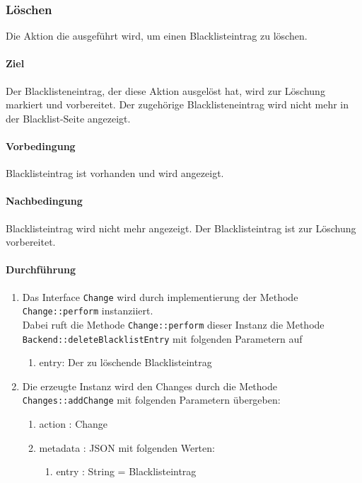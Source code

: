 \subsubsection{Löschen}

Die Aktion die ausgeführt wird, um einen Blacklisteintrag zu löschen.

\paragraph*{Ziel}
Der Blacklisteneintrag, der diese Aktion ausgelöst hat, wird zur Löschung markiert und vorbereitet.
Der zugehörige Blacklisteneintrag wird nicht mehr in der Blacklist-Seite angezeigt.

\paragraph*{Vorbedingung}
Blacklisteintrag ist vorhanden und wird angezeigt.

\paragraph*{Nachbedingung}
Blacklisteintrag wird nicht mehr angezeigt. Der Blacklisteintrag ist zur Löschung vorbereitet.

\paragraph*{Durchführung}
\begin{enumerate}
    \item Das Interface \verb#Change# wird durch implementierung der Methode \verb#Change::perform# instanziiert. \\
          Dabei ruft die Methode \verb#Change::perform# dieser Instanz die Methode \verb#Backend::deleteBlacklistEntry# mit folgenden Parametern auf \begin{enumerate}
              \item entry: Der zu löschende Blacklisteintrag
          \end{enumerate}
    \item Die erzeugte Instanz wird den Changes durch die Methode \verb#Changes::addChange# mit folgenden Parametern übergeben: \begin{enumerate}
        \item action : Change
        \item metadata : JSON mit folgenden Werten: \begin{enumerate}
            \item entry : String = Blacklisteintrag
        \end{enumerate}
    \end{enumerate}
\end{enumerate}